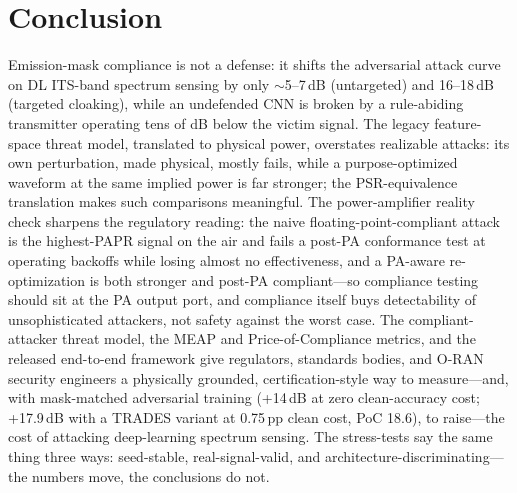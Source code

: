 \documentclass[review]{elsarticle}
\begin{document}
\section{Conclusion}
\label{sec:conclusion}

Emission-mask compliance is not a defense: it shifts the adversarial attack
curve on DL ITS-band spectrum sensing by only ${\sim}$5--7\,dB (untargeted)
and 16--18\,dB (targeted cloaking), while an undefended CNN is broken by a
rule-abiding transmitter operating tens of dB below the victim signal. The
legacy feature-space threat model, translated to physical power, overstates
realizable attacks: its own perturbation, made physical, mostly fails, while
a purpose-optimized waveform at the same implied power is far stronger; the
PSR-equivalence translation makes such comparisons meaningful. The
power-amplifier reality check sharpens the regulatory reading: the naive
floating-point-compliant attack is the highest-PAPR signal on the air and
fails a post-PA conformance test at operating backoffs while losing
almost no effectiveness, and a PA-aware re-optimization is both stronger
and post-PA compliant---so compliance testing should sit at the PA
output port, and compliance itself buys detectability of unsophisticated
attackers, not safety against the worst case. The compliant-attacker threat
model, the MEAP and Price-of-Compliance metrics, and the released
end-to-end framework give regulators, standards bodies, and O-RAN security
engineers a physically grounded, certification-style way to measure---and,
with mask-matched adversarial training (+14\,dB at zero clean-accuracy
cost; +17.9\,dB with a TRADES variant at 0.75\,pp clean cost, PoC 18.6), to
raise---the cost of attacking deep-learning spectrum sensing. The
stress-tests say the same thing three ways: seed-stable, real-signal-valid,
and architecture-discriminating---the numbers move, the conclusions do
not.
\end{document}
